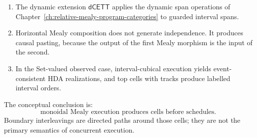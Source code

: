 \begin{enumerate}
    \item The dynamic extension \(\mathsf{dCETT}\) applies the dynamic span
    operations of Chapter~\ref{ch:relative-mealy-program-categories} to
    guarded interval spans.

    \item Horizontal Mealy composition does not generate independence. It
    produces causal pasting, because the output of the first Mealy morphism is
    the input of the second.

    \item In the Set-valued observed case, interval-cubical execution yields
    event-consistent HDA realizations, and top cells with tracks produce
    labelled interval orders.
\end{enumerate}

The conceptual conclusion is:
\[
    \text{monoidal Mealy execution produces cells before schedules.}
\]
Boundary interleavings are directed paths around those cells; they are not the
primary semantics of concurrent execution.